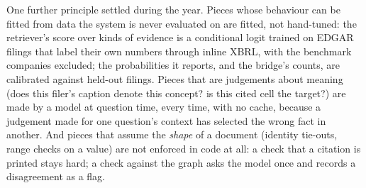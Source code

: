 One further principle settled during the year. Pieces whose behaviour can be fitted from data the system is never evaluated on are fitted, not hand-tuned: the retriever's score over kinds of evidence is a conditional logit trained on EDGAR filings that label their own numbers through inline XBRL, with the benchmark companies excluded; the probabilities it reports, and the bridge's counts, are calibrated against held-out filings. Pieces that are judgements about meaning (does this filer's caption denote this concept? is this cited cell the target?) are made by a model at question time, every time, with no cache, because a judgement made for one question's context has selected the wrong fact in another. And pieces that assume the \emph{shape} of a document (identity tie-outs, range checks on a value) are not enforced in code at all: a check that a citation is printed stays hard; a check against the graph asks the model once and records a disagreement as a flag.
